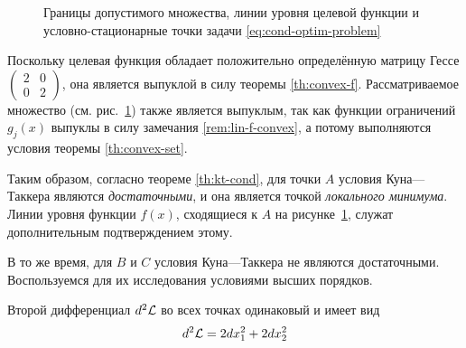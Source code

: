\begin{figure}[!h]
  \centering
  \caption[Границы допустимого множества, линии уровня целевой функции
  и условно-стационарные точки задачи условной оптимизации]{Границы
    допустимого множества, линии уровня целевой функции и
    условно-стационарные точки задачи \eqref{eq:cond-optim-problem}}
  \label{fig:cond-optim}
\end{figure}

Поскольку целевая функция обладает положительно определённую матрицу
Гессе $\left( \begin{smallmatrix}2 & 0 \\ 0 & 2\end{smallmatrix}
\right)$, она является выпуклой в силу теоремы \ref{th:convex-f}.
Рассматриваемое множество (см. рис. \ref{fig:cond-optim}) также
является выпуклым, так как функции ограничений $g_j(x)$ выпуклы в силу
замечания \ref{rem:lin-f-convex}, а потому выполняются условия теоремы
\ref{th:convex-set}.

Таким образом, согласно теореме \ref{th:kt-cond}, для точки $A$
условия Куна—Таккера являются \emph{достаточными}, и она является
точкой \emph{локального минимума}. Линии уровня функции $f(x)$,
сходящиеся к $A$ на рисунке \ref{fig:cond-optim}, служат
дополнительным подтверждением этому.

В то же время, для $B$ и $C$ условия Куна—Таккера не являются
достаточными. Воспользуемся для их исследования условиями высших
порядков.

Второй дифференциал $d^2\mathcal{L}$ во всех точках одинаковый и имеет вид
\begin{equation}
  \label{eq:la-diff}
  d^2\mathcal{L} = 2dx_1^2 + 2 dx_2^2
\end{equation}

